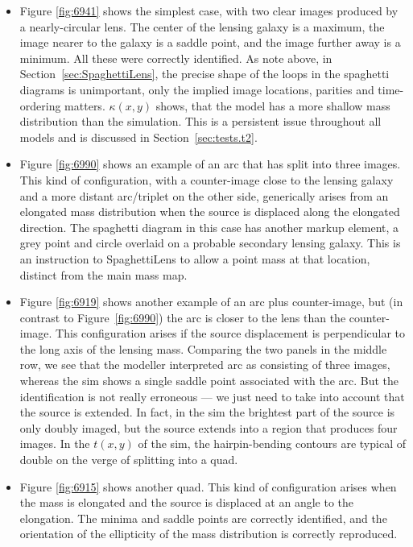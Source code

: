 \documentclass[usenatbib]{mn2e}
\newcommand{\spl}{SpaghettiLens\xspace}
\newcommand{\figref}[1]{Figure~\ref{fig:#1}}
\newcommand{\secref}[1]{Section~\ref{sec:#1}}
\begin{document}
\begin{itemize}

\item Figure \ref{fig:6941} shows the simplest case, with two clear
  images produced by a nearly-circular lens.  The center of the
  lensing galaxy is a maximum, the image nearer to the galaxy is a
  saddle point, and the image further away is a minimum.  All these
  were correctly identified.  As note above, in
  \secref{SpaghettiLens}, the precise shape of the loops in the
  spaghetti diagrams is unimportant, only the implied image locations,
  parities and time-ordering matters. $\kappa(x,y)$ shows, that
  the model has a more shallow mass distribution than the simulation.
  This is a persistent issue throughout all models and is discussed in
  \secref{tests.t2}.

\item Figure \ref{fig:6990} shows an example of an arc that has split
  into three images.  This kind of configuration, with a counter-image
  close to the lensing galaxy and a more distant arc/triplet on the
  other side, generically arises from an elongated mass distribution
  when the source is displaced along the elongated direction.  The
  spaghetti diagram in this case has another markup element, a grey
  point and circle overlaid on a probable secondary lensing galaxy.
  This is an instruction to \spl to allow a point mass at that
  location, distinct from the main mass map.

\item Figure \ref{fig:6919} shows another example of an arc plus
  counter-image, but (in contrast to \figref{6990}) the arc is closer
  to the lens than the counter-image. This configuration arises if the
  source displacement is perpendicular to the long axis of the lensing
  mass.  Comparing the two panels in the middle row, we see that the
  modeller interpreted arc as consisting of three images, whereas the
  sim shows a single saddle point associated with the arc.  But the
  identification is not really erroneous --- we just need to take into
  account that the source is extended.  In fact, in the sim the
  brightest part of the source is only doubly imaged, but the source
  extends into a region that produces four images.  In the $t(x,y)$ of
  the sim, the hairpin-bending contours are typical of double on the
  verge of splitting into a quad.

\item Figure \ref{fig:6915} shows another quad.  This kind of
  configuration arises when the mass is elongated and the source is
  displaced at an angle to the elongation.  The minima and saddle
  points are correctly identified, and the orientation of the
  ellipticity of the mass distribution is correctly reproduced.


\end{itemize}
\end{document}
